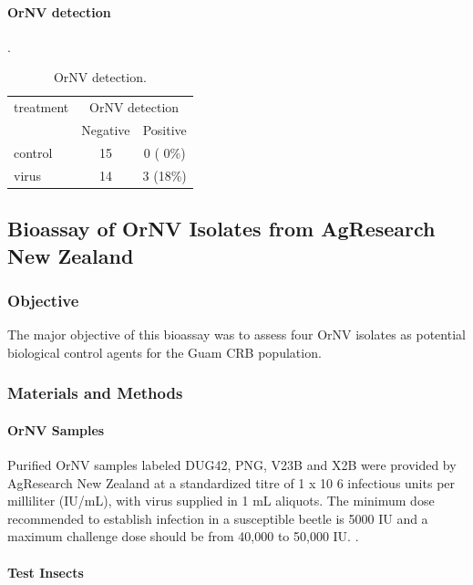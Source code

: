 \documentclass[12pt,letterpaper,english,bibliography=totocnumbered, abstract=on]{scrartcl}
\begin{document}
\clearpage
\paragraph{OrNV detection}.

\begin{table}[H]
	\centering
	\caption{OrNV detection.}
	\label{ornv detection}
	\begin{tabular}{lcc}
		\hline
		treatment  & \multicolumn{2}{c}{OrNV detection} \\ \cline{2-3}
		& Negative & Positive \\
		\hline
		control    & 15 & 0 ( 0\%)\\
		virus      & 14 & 3 (18\%)\\
		\hline
	\end{tabular}
\end{table}

\clearpage
\subsection{Bioassay of OrNV Isolates from AgResearch New Zealand}

\subsubsection{Objective}

The major objective of this bioassay was to assess four OrNV isolates as potential biological control agents for the Guam CRB population. 

\subsubsection{Materials and Methods}

\paragraph{OrNV Samples}

Purified OrNV samples labeled DUG42, PNG, V23B and X2B were provided by AgResearch New Zealand at a standardized titre of 1 x 10 6 infectious units per milliliter (IU/mL), with virus supplied in 1 mL aliquots. The minimum dose recommended to establish infection in a susceptible beetle is 5000 IU and a maximum challenge dose should be from 40,000 to 50,000 IU. \cite{AgResearch2023-OrNV-prep2023}.

\paragraph{Test Insects}
\end{document}
